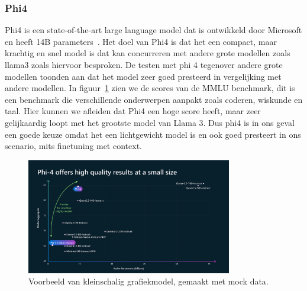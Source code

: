 \subsubsection{Phi4}
Phi4 is een state-of-the-art large language model dat is ontwikkeld door Microsoft en heeft 14B parameters~\autocite{Kamar2024}.
Het doel van Phi4 is dat het een compact, maar krachtig en snel model is dat kan concurreren met andere grote modellen zoals llama3 zoals hiervoor besproken.
De testen met phi 4 tegenover andere grote modellen toonden aan dat het model zeer goed presteerd in vergelijking met andere modellen.
In figuur~\ref{fig:MMLU} zien we de scores van de MMLU benchmark, dit is een benchmark die verschillende onderwerpen aanpakt zoals coderen, wiskunde en taal.
Hier kunnen we afleiden dat Phi4 een hoge score heeft, maar zeer gelijkaardig loopt met het grootste model van Llama 3.
Dus phi4 is in ons geval een goede keuze omdat het een lichtgewicht model is en ook goed presteert in ons scenario, mits finetuning met context.

\begin{figure}[h]
     \centering
     \includegraphics[width=0.8\textwidth]{./img/MMLU.png}
     \caption[Voorbeeld Grafiekmodel.]{\label{fig:MMLU}Voorbeeld van kleinschalig grafiekmodel, gemaakt met mock data.}
\end{figure}

